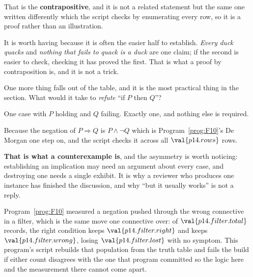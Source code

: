 \begin{fr}
That is the \textbf{contrapositive}, and it is not a related statement but the
same one written differently \dash{} which the script checks by enumerating
every row, so it is a proof rather than an illustration.

It is worth having because it is often the easier half to establish.
\emph{Every duck quacks} and \emph{nothing that fails to quack is a duck} are
one claim; if the second is easier to check, checking it has proved the first.
That is what a proof by contraposition is, and it is not a trick.

\end{fr}

\begin{fr}
One more thing falls out of the table, and it is the most practical thing in
the section. What would it take to \emph{refute} \enquote{if $P$ then $Q$}?
\nextframe
\end{fr}

\begin{fr}
\begin{ansblock}
One case with $P$ holding and $Q$ failing. Exactly one, and nothing else is
required.
\end{ansblock}

Because the negation of $P \Rightarrow Q$ is $P \wedge \lnot Q$ \dash{} which
is Program~\ref{prog:F10}'s De Morgan one step on, and the script checks it
across all $\val{p14.rows}$ rows.

\textbf{That is what a counterexample is}, and the asymmetry is worth
noticing: establishing an implication may need an argument about every case,
and destroying one needs a single exhibit. It is why a reviewer who produces
one instance has finished the discussion, and why \enquote{but it usually
works} is not a reply.

\begin{note}
Program~\ref{prog:F10} measured a negation pushed through the wrong
connective in a filter, which is the same move one connective over:
of $\val{p14.filter.total}$ records, the right condition keeps
$\val{p14.filter.right}$ and  keeps
$\val{p14.filter.wrong}$, losing $\val{p14.filter.lost}$ with no symptom. This
program's script rebuilds that population from the truth table and fails the
build if either count disagrees with the one that program committed \dash{} so
the logic here and the measurement there cannot come apart.
\end{note}
\end{fr}

